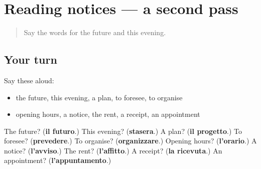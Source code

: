 \section[(dialogue)]{Reading notices — a second pass}

\label{lesson:IT-R139-second-pass-reading-notices}



\begin{quote}
Say the words for the future and this evening.
\end{quote}

\subsection*{Your turn}
Say these aloud:

\begin{itemize}
\raggedright
  \item the future, this evening, a plan, to foresee, to organise
  \item opening hours, a notice, the rent, a receipt, an appointment
\end{itemize}

\begin{tcolorbox}[breakable,colback=teal!4,colframe=teal!35!black,title={Before you move on}]
The future? (\textbf{il futuro}.) This evening? (\textbf{stasera}.) A plan? (\textbf{il progetto}.) To foresee? (\textbf{prevedere}.) To organise? (\textbf{organizzare}.) Opening hours? (\textbf{l'orario}.) A notice? (\textbf{l'avviso}.) The rent? (\textbf{l'affitto}.) A receipt? (\textbf{la ricevuta}.) An appointment? (\textbf{l'appuntamento}.)
\end{tcolorbox}
